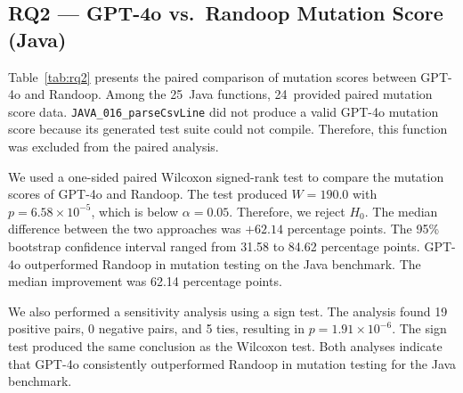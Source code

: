 \subsection{RQ2 --- GPT-4o vs.\ Randoop Mutation Score (Java)}
\label{subsec:rq2}

Table~\ref{tab:rq2} presents the paired comparison of mutation scores between GPT-4o and Randoop.
Among the 25~Java functions, 24~provided paired mutation score data. \texttt{JAVA\_016\_parseCsvLine} did not produce a valid GPT-4o mutation score because its generated test suite could not compile. Therefore, this function was excluded from the paired analysis.

\begin{table}[ht]
\centering
\caption{RQ2: Paired Mutation Score --- GPT-4o vs.\ Randoop (Java, $n = 24$)}
\label{tab:rq2}
\end{table}

We used a one-sided paired Wilcoxon signed-rank test to compare the mutation scores of GPT-4o and Randoop. The test produced $W = 190.0$ with $p = 6.58 \times 10^{-5}$, which is below $\alpha = 0.05$. Therefore, we reject $H_0$.
The median difference between the two approaches was $+62.14$ percentage points. The 95\% bootstrap confidence interval ranged from 31.58 to 84.62 percentage points. GPT-4o outperformed Randoop in mutation testing on the Java benchmark. The median improvement was 62.14 percentage points.

We also performed a sensitivity analysis using a sign test. The analysis found 19 positive pairs, 0 negative pairs, and 5 ties, resulting in $p = 1.91 \times 10^{-6}$.
The sign test produced the same conclusion as the Wilcoxon test. Both analyses indicate that GPT-4o consistently outperformed Randoop in mutation testing for the Java benchmark.

